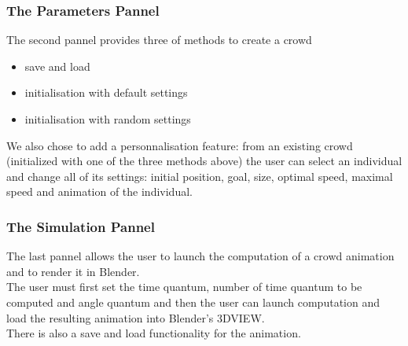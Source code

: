 \subsubsection{The Parameters Pannel}
The second pannel provides three of methods to create a crowd 
\begin{itemize}
\item save and load
\item initialisation with default settings
\item initialisation with random settings
\end{itemize}

We also chose to add a personnalisation feature: from an existing crowd (initialized with one of the three methods above) the user can select an individual and change all of its settings: initial position, goal, size, optimal speed, maximal speed and animation of the individual.


\subsubsection{The Simulation Pannel}
The last pannel allows the user to launch the computation of a crowd animation and to render it in Blender.\\
The user must first set the time quantum, number of time quantum to be computed and angle quantum and then the user can launch computation and load the resulting animation into Blender's 3DVIEW.\\
There is also a save and load functionality for the animation.

\begin{figure}
\centering
{} ~ 
 ~ 
\label{3figs}

\end{figure}
